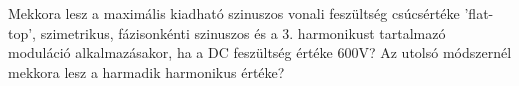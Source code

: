 \begin{example}

Mekkora lesz a maximális kiadható szinuszos vonali feszültség csúcsértéke ’flat-top’, szimetrikus, fázisonkénti szinuszos és a 3. harmonikust tartalmazó moduláció alkalmazásakor, ha a DC feszültség értéke 600V?  Az utolsó módszernél mekkora lesz a harmadik harmonikus értéke?

\tcbline
\vspace{1mm}

\solution

\end{example}